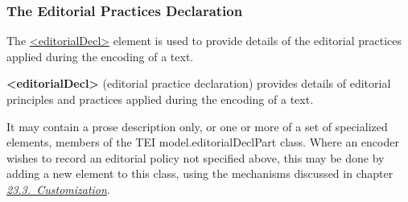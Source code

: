 \subsubsection[{The Editorial Practices Declaration}]{The Editorial Practices Declaration}\label{HD53}\par
The \hyperref[TEI.editorialDecl]{<editorialDecl>} element is used to provide details of the editorial practices applied during the encoding of a text. 
\begin{sansreflist}
  
\item [\textbf{<editorialDecl>}] (editorial practice declaration) provides details of editorial principles and practices applied during the encoding of a text.
\end{sansreflist}
It may contain a prose description only, or one or more of a set of specialized elements, members of the TEI \textsf{model.editorialDeclPart} class. Where an encoder wishes to record an editorial policy not specified above, this may be done by adding a new element to this class, using the mechanisms discussed in chapter \textit{\hyperref[MD]{23.3.\ Customization}}.\par
